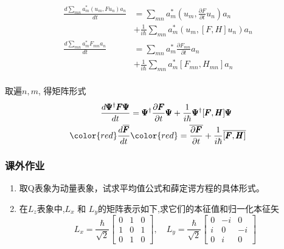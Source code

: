 \begin{frame} 
    \begin{equation*}
        \begin{split}
            \frac{d\sum_{mn}a_m ^* (u_m,Fu_n )a_n}{dt} &=\sum_{mn} a_m ^*  (u_m,\frac{\partial F }{\partial t} u_n)a_n \\  
            &+\frac{1}{i\hbar} \sum_{mn} a_m ^*  ( u_m,[F,H] u_n)a_n  \\  
            \frac{d\sum_{mn}a_m ^* F_{mn}a_n}{dt} &=\sum_{mn} a_m ^*  \frac{\partial F_{mn} }{\partial t}a_n \\  
            &+\frac{1}{i\hbar} \sum_{mn} a_m ^* [F_{mn},H_{mn}]a_n  \\       
        \end{split} 
    \end{equation*}
\end{frame}

\begin{frame} 
    取遍$n,m$, 得矩阵形式
    \begin{equation*}
        \begin{split} 
            \frac{d \pmb \Psi^{\dagger } \pmb F \pmb \Psi}{dt} &=\pmb \Psi^{\dagger } \frac{\partial \pmb F }{\partial t} \pmb \Psi +\frac{1}{i\hbar} \pmb \Psi^{\dagger } [\pmb F, \pmb H] \pmb \Psi \\ \vspace{0.6em}  
           \color{red} \frac{d \overline{\pmb F}}{dt} & \color{red} =\overline{\frac{\partial \pmb F }{\partial t}} +\frac{1}{i\hbar} \overline{ [\pmb F,\pmb H]} \\      
        \end{split} 
    \end{equation*}
\end{frame}

\begin{frame}
    \frametitle{课外作业}
    \begin{enumerate}
        \item 取Q表象为动量表象，试求平均值公式和薛定谔方程的具体形式。
        \item 在$L_z$表象中,$L_x$ 和 $L_y$的矩阵表示如下,求它们的本征值和归一化本征矢 \\
        \[L_x= \frac{\hbar}{\sqrt{2}}\begin{bmatrix}
            0 & 1 & 0 \\
            1 & 0 & 1 \\
            0 & 1 & 0
        \end{bmatrix}, \quad L_y= \frac{\hbar}{\sqrt{2}}\begin{bmatrix}
            0 & -i & 0 \\
            i & 0 & -i \\
            0 & i & 0
        \end{bmatrix} \]
    \end{enumerate}
\end{frame}



